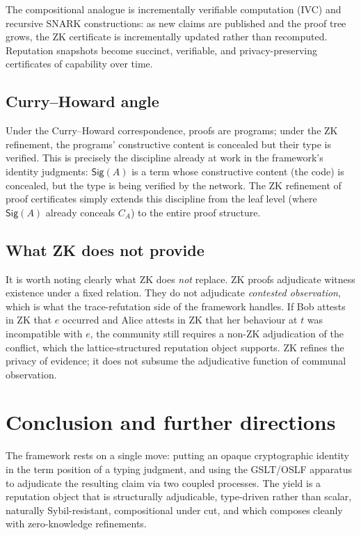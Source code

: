 \documentclass[11pt]{article}
\theoremstyle{definition}
\theoremstyle{plain}
\theoremstyle{remark}
\newcommand{\Sig}{\mathsf{Sig}}
\begin{document}
The compositional analogue is incrementally verifiable computation (IVC) and recursive SNARK constructions: as new claims are published and the proof tree grows, the ZK certificate is incrementally updated rather than recomputed. Reputation snapshots become succinct, verifiable, and privacy-preserving certificates of capability over time.

\subsection{Curry--Howard angle}

Under the Curry--Howard correspondence, proofs are programs; under the ZK refinement, the programs' constructive content is concealed but their type is verified. This is precisely the discipline already at work in the framework's identity judgments: $\Sig(A)$ is a term whose constructive content (the code) is concealed, but the type is being verified by the network. The ZK refinement of proof certificates simply extends this discipline from the leaf level (where $\Sig(A)$ already conceals $C_A$) to the entire proof structure.

\subsection{What ZK does not provide}

It is worth noting clearly what ZK does \emph{not} replace. ZK proofs adjudicate witness existence under a fixed relation. They do not adjudicate \emph{contested observation}, which is what the trace-refutation side of the framework handles. If Bob attests in ZK that $e$ occurred and Alice attests in ZK that her behaviour at $t$ was incompatible with $e$, the community still requires a non-ZK adjudication of the conflict, which the lattice-structured reputation object supports. ZK refines the privacy of evidence; it does not subsume the adjudicative function of communal observation.

\section{Conclusion and further directions}

The framework rests on a single move: putting an opaque cryptographic identity in the term position of a typing judgment, and using the GSLT/OSLF apparatus to adjudicate the resulting claim via two coupled processes. The yield is a reputation object that is structurally adjudicable, type-driven rather than scalar, naturally Sybil-resistant, compositional under cut, and which composes cleanly with zero-knowledge refinements.
\end{document}
